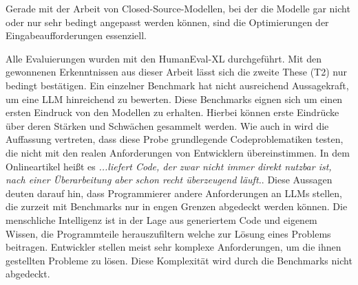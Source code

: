 Gerade mit der Arbeit von Closed-Source-Modellen, bei der die Modelle gar nicht oder nur sehr bedingt angepasst werden können, sind die Optimierungen der Eingabeaufforderungen essenziell.\vspace{0.2cm}

Alle Evaluierungen wurden mit den HumanEval-XL durchgeführt. Mit den gewonnenen Erkenntnissen aus dieser Arbeit lässt sich die zweite These (T2) nur bedingt bestätigen. Ein einzelner Benchmark hat nicht ausreichend Aussagekraft, um eine LLM hinreichend zu bewerten. Diese Benchmarks eignen sich um einen ersten Eindruck von den Modellen zu erhalten. Hierbei können erste Eindrücke über deren Stärken und Schwächen gesammelt werden. Wie auch in \cite{zhang-2024} wird die Auffassung vertreten, dass diese Probe grundlegende Codeproblematiken testen, die nicht mit den realen Anforderungen von Entwicklern übereinstimmen. In dem Onlineartikel \cite{albrecht-2023} heißt es \glqq \textit{...liefert Code, der zwar nicht immer direkt nutzbar ist, nach einer Überarbeitung aber schon recht überzeugend läuft.}\grqq. Diese Aussagen deuten darauf hin, dass Programmierer andere Anforderungen an LLMs stellen, die zurzeit mit Benchmarks nur in engen Grenzen abgedeckt werden können.
Die menschliche Intelligenz ist in der Lage aus generiertem Code und eigenem Wissen, die Programmteile herauszufiltern welche zur Lösung eines Problems beitragen. Entwickler stellen meist sehr komplexe Anforderungen, um die ihnen gestellten Probleme zu lösen. Diese Komplexität wird durch die Benchmarks nicht abgedeckt.\vspace{0.2cm}

